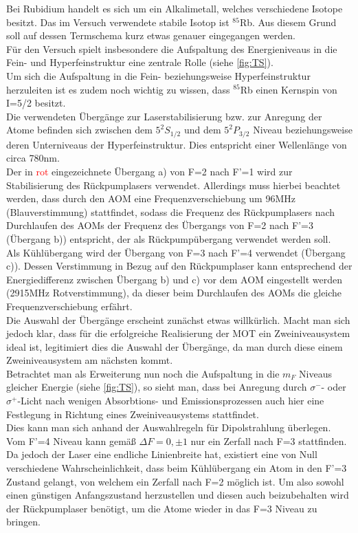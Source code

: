 \documentclass[
class=book,
accentcolor=1b,
custommargins=geometry,
fontsize=11pt,
thesis={type=Versuchsanleitung},
ruledheaders=all,
headline=false,
instbox=false,
marginpar=false,
title=small,
ignore-missing-data=true,
twoside=false,
pdfa=false %
]{apqpub}
\begin{document}
					Bei Rubidium handelt es sich um ein Alkalimetall, welches verschiedene Isotope besitzt. Das im Versuch verwendete stabile Isotop ist $^{85}$Rb. Aus diesem Grund soll auf dessen Termschema kurz etwas genauer eingegangen werden.\\
					Für den Versuch spielt insbesondere die Aufspaltung des Energieniveaus in die Fein- und Hyperfeinstruktur eine zentrale Rolle (siehe \autoref{fig:TS}).\\
					Um sich die Aufspaltung in die Fein- beziehungsweise Hyperfeinstruktur herzuleiten ist es zudem noch wichtig zu wissen, dass $^{85}$Rb einen Kernspin von I=5/2 besitzt.\\ 
					Die verwendeten Übergänge zur Laserstabilisierung bzw. zur Anregung der Atome befinden sich zwischen dem $5^2S_{1/2}$ und dem $5^2P_{3/2}$ Niveau beziehungsweise deren Unterniveaus der Hyperfeinstruktur. Dies entspricht einer Wellenlänge von circa 780nm.\\
					Der in \textcolor{red}{rot} eingezeichnete Übergang a) von F=2 nach F'=1 wird zur Stabilisierung des Rückpumplasers verwendet. Allerdings muss hierbei beachtet werden, dass durch den AOM eine Frequenzverschiebung um 96MHz (Blauverstimmung) stattfindet, sodass die Frequenz des Rückpumplasers nach Durchlaufen des AOMs der Frequenz des Übergangs von F=2 nach F'=3 (Übergang b)) entspricht, der als Rückpumpübergang verwendet werden soll.\\
					Als Kühlübergang wird der Übergang von F=3 nach F'=4 verwendet (Übergang c)). Dessen Verstimmung in Bezug auf den Rückpumplaser kann entsprechend der Energiedifferenz zwischen Übergang b) und c) vor dem AOM eingestellt werden (2915MHz Rotverstimmung), da dieser beim Durchlaufen des AOMs die gleiche Frequenzverschiebung erfährt.\\   
					Die Auswahl der Übergänge erscheint zunächst etwas willkürlich. Macht man sich jedoch klar, dass für die erfolgreiche Realisierung der MOT ein Zweiniveausystem ideal ist, legitimiert dies die Auswahl der Übergänge, da man durch diese einem Zweiniveausystem am nächsten kommt.\\
					Betrachtet man als Erweiterung nun noch die Aufspaltung in die $m_F$ Niveaus gleicher Energie (siehe \autoref{fig:TS}), so sieht man, dass bei Anregung durch $\sigma^-$- oder $\sigma^+$-Licht nach wenigen Absorbtions- und Emissionsprozessen auch hier eine Festlegung in Richtung eines Zweiniveausystems stattfindet.\\  
					Dies kann man sich anhand der Auswahlregeln für Dipolstrahlung überlegen. Vom F'=4 Niveau kann gemäß $\varDelta F=0,\pm1$ nur ein Zerfall nach F=3 stattfinden. Da jedoch der Laser eine endliche Linienbreite hat, existiert eine von  Null verschiedene Wahrscheinlichkeit, dass beim Kühlübergang ein Atom in den F'=3 Zustand gelangt, von welchem ein Zerfall nach F=2 möglich ist. Um also sowohl einen günstigen Anfangszustand herzustellen und diesen auch beizubehalten wird der Rückpumplaser benötigt, um die Atome wieder in das F=3 Niveau zu bringen.\\
\end{document}
